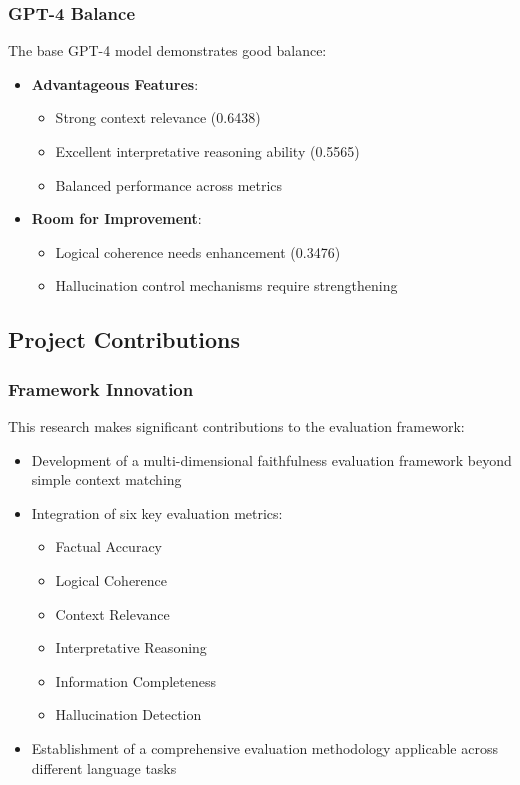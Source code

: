 \subsubsection{GPT-4 Balance}
The base GPT-4 model demonstrates good balance:
\begin{itemize}
    \item \textbf{Advantageous Features}:
    \begin{itemize}
        \item Strong context relevance (0.6438)
        \item Excellent interpretative reasoning ability (0.5565)
        \item Balanced performance across metrics
    \end{itemize}
    \item \textbf{Room for Improvement}:
    \begin{itemize}
        \item Logical coherence needs enhancement (0.3476)
        \item Hallucination control mechanisms require strengthening
    \end{itemize}
\end{itemize}

\subsection{Project Contributions}

\subsubsection{Framework Innovation}
This research makes significant contributions to the evaluation framework:
\begin{itemize}
    \item Development of a multi-dimensional faithfulness evaluation framework beyond simple context matching
    \item Integration of six key evaluation metrics:
    \begin{itemize}
        \item Factual Accuracy
        \item Logical Coherence
        \item Context Relevance
        \item Interpretative Reasoning
        \item Information Completeness
        \item Hallucination Detection
    \end{itemize}
    \item Establishment of a comprehensive evaluation methodology applicable across different language tasks
\end{itemize}

